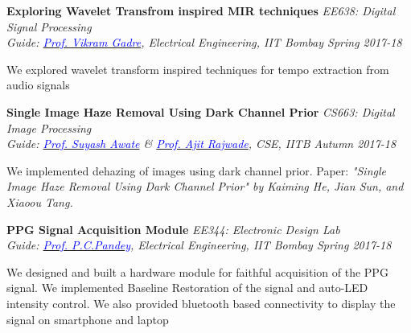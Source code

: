 \documentclass[margin,line]{res}
\newenvironment{list1}{
  \begin{list}{\ding{113}}{%
      \setlength{\itemsep}{0in}
      \setlength{\parsep}{0in} \setlength{\parskip}{0in}
      \setlength{\topsep}{0in} \setlength{\partopsep}{0in} 
      \setlength{\leftmargin}{0.17in}}}{\end{list}}
\begin{document}
\begin{resume}

{\bf Exploring Wavelet Transfrom inspired MIR techniques} \hfill \textit{EE638: Digital Signal Processing} \\
{\em Guide: \href{https://www.ee.iitb.ac.in/wiki/faculty/vmgadre}{\textcolor{blue}{Prof. Vikram Gadre}}, Electrical Engineering, IIT Bombay \hfill Spring 2017-18} \\
\vspace*{-.15in}
\begin{list1}
\item[] We explored wavelet transform inspired techniques for tempo extraction from audio signals
\end{list1}


{\bf Single Image Haze Removal Using Dark Channel Prior} \hfill \textit{CS663: Digital Image Processing} \\
{\em Guide: \href{https://www.cse.iitb.ac.in/~suyash}{\textcolor{blue}{Prof. Suyash Awate}} \& \href{https://www.cse.iitb.ac.in/~ajitvr}{\textcolor{blue}{Prof. Ajit Rajwade}}, CSE, IITB \hfill Autumn 2017-18} \\
\vspace*{-.15in}
\begin{list1}
\item[] We implemented dehazing of images using dark channel prior. Paper: \textit{"Single Image Haze Removal Using Dark Channel Prior" by Kaiming He, Jian Sun, and Xiaoou Tang.} 
\end{list1}


{\bf PPG Signal Acquisition Module} \hfill \textit{EE344: Electronic Design Lab} \\
{\em Guide: \href{https://www.ee.iitb.ac.in/~pcpandey/}{\textcolor{blue}{Prof. P.C.Pandey}}, Electrical Engineering, IIT Bombay \hfill Spring 2017-18} \\
\vspace*{-.15in}
\begin{list1}
\item[] We designed and built a hardware module for faithful acquisition of the PPG signal. We implemented Baseline Restoration of the signal and auto-LED intensity control. We also provided bluetooth based connectivity to display the signal on smartphone and laptop
\end{list1}



\end{resume}
\end{document}
